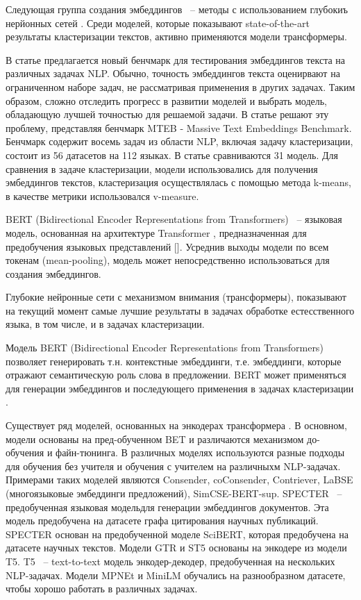 Следующая группа создания эмбеддингов ~-- методы с использованием глубокиъ нерйонных сетей \cite{no-patterns}. Среди моделей, которые показывают state-of-the-art результаты кластеризации текстов, активно применяются модели трансформеры.

В статье \cite{mteb} предлагается новый бенчмарк для тестирования эмбеддингов текста на различных задачах NLP. Обычно, точность эмбеддингов текста оценирвают на ограниченном наборе задач, не рассматривая применения в других задачах. Таким образом, сложно отследить прогресс в развитии моделей и выбрать модель, обладающую лучшей  точностью для решаемой задачи. В статье решают эту проблему, представляя бенчмарк MTEB - Massive Text Embeddings Benchmark. Бенчмарк содержит восемь задач из области NLP, включая задачу кластеризации, состоит из 56 датасетов на 112 языках. В статье сравниваются 31 модель. Для сравнения в задаче кластеризации, модели использовались для получения эмбеддингов текстов, кластеризация осуществлялась с помощью метода k-means, в качестве метрики использовался v-measure.

BERT (Bidirectional Encoder Representations from Transformers) ~-- языковая модель, основанная на архитектуре Transformer , предназначенная для предобучения языковых представлений [\cite{bert}]. Усреднив выходы модели по всем токенам (mean-pooling), модель может непосредственно использоваться для создания эмбеддингов.

Глубокие нейронные сети с механизмом внимания (трансформеры), показывают на текущий момент самые лучшие результаты в задачах обработке естесственного языка, в том числе, и в задачах кластеризации.

Модель BERT (Bidirectional Encoder Representations from Transformers) позволяет генерировать т.н. контекстные эмбеддинги, т.е. эмбеддинги, которые отражают семантическую роль слова в предложении. BERT может применяться для генерации эмбеддингов и последующего применения в задачах кластеризации \cite{text-clustering-with-bert}.

Существует ряд моделей, основанных на энкодерах трансформера \cite{mteb}. В основном, модели основаны на пред-обученном BET и различаются механизмом до-обучения и файн-тюнинга. В различных моделях используются разные подходы для обучения без учителя и обучения с учителем на различныхм NLP-задачах. Примерами таких моделей являются Consender, coConsender, Contriever, LaBSE (многоязыковые эмбеддинги предложений), SimCSE-BERT-sup.  SPECTER ~-- предобученная языковая модельдля генерации эмбеддингов документов. Эта модель предобучена на датасете графа цитирования научных публикаций. SPECTER основан на предобученной моделе SciBERT, которая предобучена на датасете научных текстов. Модели GTR и ST5 основаны на энкодере из модели T5. T5 ~-- text-to-text модель энкодер-декодер, предобученная на нескольких NLP-задачах. Модели MPNEt и MiniLM обучались на разнообразном датасете, чтобы хорошо работать в различных задачах.


